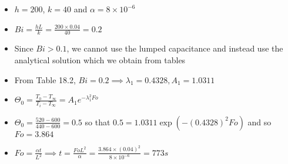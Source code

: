 \documentclass[12pt]{article}
\begin{document}
\begin{itemize}
\begin{itemize}
        \item $h = 200$, $k = 40$ and $\alpha = 8 \times 10^{-6}$
        \item $Bi = \frac{hL}{k} = \frac{200 \times 0.04}{40} = 0.2$
        \item Since $Bi > 0.1$, we cannot use the lumped capacitance and instead use the analytical solution which we obtain from tables
        \item From Table 18.2, $Bi = 0.2 \implies \lambda_1 = 0.4328, A_1 = 1.0311$
        \item $\Theta_0 = \frac{T_0 - T_{\infty}}{T_i - T_{\infty}} = A_1 e^{- \lambda_1^2 Fo}$
        \item $\Theta_0 = \frac{520 - 600}{440-600} = 0.5$ so that $0.5 = 1.0311 \exp (- (0.4328)^2 Fo)$ and so $Fo = 3.864$
        \item $Fo = \frac{\alpha t}{L^2} \implies t = \frac{Fo L^2}{\alpha} = \frac{3.864 \times (0.04)^2}{8 \times 10^{-6}} = 773 s$
    \end{itemize}
\end{itemize}
\end{document}
